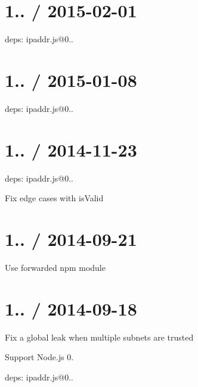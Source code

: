 \section*{1.. / 2015-\/02-\/01 }


\begin{DoxyItemize}
\item deps\+: ipaddr.\+js@0..
\end{DoxyItemize}

\section*{1.. / 2015-\/01-\/08 }


\begin{DoxyItemize}
\item deps\+: ipaddr.\+js@0..
\end{DoxyItemize}

\section*{1.. / 2014-\/11-\/23 }


\begin{DoxyItemize}
\item deps\+: ipaddr.\+js@0..
\begin{DoxyItemize}
\item Fix edge cases with {\ttfamily is\+Valid}
\end{DoxyItemize}
\end{DoxyItemize}

\section*{1.. / 2014-\/09-\/21 }


\begin{DoxyItemize}
\item Use {\ttfamily forwarded} npm module
\end{DoxyItemize}

\section*{1.. / 2014-\/09-\/18 }


\begin{DoxyItemize}
\item Fix a global leak when multiple subnets are trusted
\item Support Node.\+js 0.
\item deps\+: ipaddr.\+js@0..
\end{DoxyItemize}

